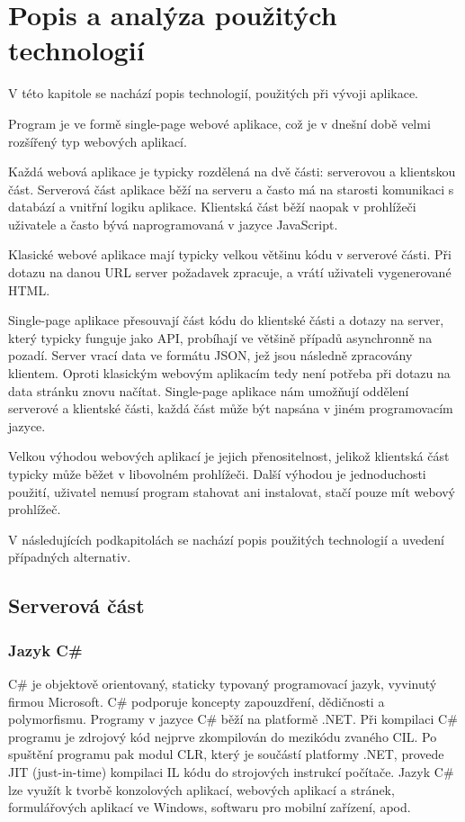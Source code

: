 
\chapter{Popis a analýza použitých technologií}

V této kapitole se nachází popis technologií, použitých při vývoji aplikace.

Program je ve formě single-page webové aplikace, což je v dnešní době velmi rozšířený typ webových aplikací.

Každá webová aplikace je typicky rozdělená na dvě části: serverovou a klientskou část. Serverová část aplikace běží na serveru a často má na starosti komunikaci s databází a vnitřní logiku aplikace. Klientská část běží naopak v prohlížeči uživatele a často bývá naprogramovaná v jazyce JavaScript. 

Klasické webové aplikace mají typicky velkou většinu kódu v serverové části. Při dotazu na danou URL server požadavek zpracuje, a vrátí uživateli vygenerované HTML.

Single-page aplikace přesouvají část kódu do klientské části a dotazy na server, který typicky funguje jako API, probíhají ve většině případů asynchronně na pozadí.
Server vrací data ve formátu JSON, jež jsou následně zpracovány klientem. Oproti klasickým webovým aplikacím tedy není potřeba při dotazu na data stránku znovu načítat.
Single-page aplikace nám umožňují oddělení serverové a klientské části, každá část může být napsána v jiném programovacím jazyce.

Velkou výhodou webových aplikací je jejich přenositelnost, jelikož klientská část typicky může běžet v libovolném prohlížeči.
Další výhodou je jednoduchosti použití, uživatel nemusí program stahovat ani instalovat, stačí pouze mít webový prohlížeč.

V následujících podkapitolách se nachází popis použitých technologií a uvedení případných alternativ.

\section{Serverová část}

\subsection{Jazyk C\#}
C\# je objektově orientovaný, staticky typovaný programovací jazyk, vyvinutý firmou Microsoft.
C\# podporuje koncepty zapouzdření, dědičnosti a polymorfismu. Programy v jazyce C\# běží na platformě .NET. 
Při kompilaci C\# programu je zdrojový kód nejprve zkompilován do mezikódu zvaného CIL. 
Po spuštění programu pak modul CLR, který je součástí platformy .NET, provede JIT (just-in-time) kompilaci IL kódu do strojových instrukcí počítače.
Jazyk C\# lze využít k tvorbě konzolových aplikací, webových aplikací a stránek, formulářových aplikací ve Windows, softwaru pro mobilní zařízení, apod. 
\cite{CSharpDocs}

